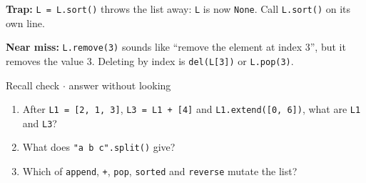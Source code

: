 \documentclass[11pt]{article}
\begin{document}
\begin{keepsection}
\begin{notebox}\textbf{Trap:} \texttt{L = L.sort()} throws the list away: \texttt{L} is now \texttt{None}. Call \texttt{L.sort()} on its own line.\end{notebox}

\begin{notebox}\textbf{Near miss:} \texttt{L.remove(3)} sounds like “remove the element at index 3”, but it removes the value 3. Deleting by index is \texttt{del(L[3])} or \texttt{L.pop(3)}.\end{notebox}

\begin{recallbox}{Recall check \ensuremath{\cdot} answer without looking}
\begin{enumerate}
\item After \texttt{L1 = [2, 1, 3]}, \texttt{L3 = L1 + [4]} and \texttt{L1.extend([0, 6])}, what are \texttt{L1} and \texttt{L3}?
\item What does \texttt{"a b c".split()} give?
\item Which of \texttt{append}, \texttt{+}, \texttt{pop}, \texttt{sorted} and \texttt{reverse} mutate the list?
\end{enumerate}

\end{recallbox}
\end{keepsection}
\end{document}
